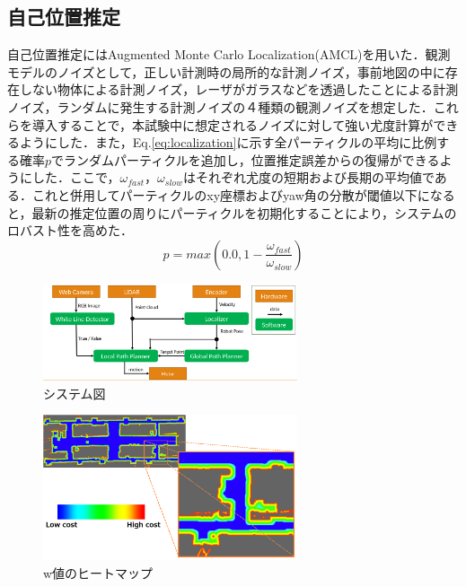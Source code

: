 \documentclass{jarticle}
\begin{document}
\subsection{自己位置推定}
自己位置推定にはAugmented Monte Carlo Localization(AMCL)\cite{localization}を用いた．観測モデルのノイズとして，正しい計測時の局所的な計測ノイズ，事前地図の中に存在しない物体による計測ノイズ，レーザがガラスなどを透過したことによる計測ノイズ，ランダムに発生する計測ノイズの４種類の観測ノイズを想定した．これらを導入することで，本試験中に想定されるノイズに対して強い尤度計算ができるようにした．また，Eq.\ref{eq:localization}に示す全パーティクルの平均に比例する確率$p$でランダムパーティクルを追加し，位置推定誤差からの復帰ができるようにした．ここで，$\omega_{fast}$，$\omega_{slow}$はそれぞれ尤度の短期および長期の平均値である．これと併用してパーティクルのxy座標およびyaw角の分散が閾値以下になると，最新の推定位置の周りにパーティクルを初期化することにより，システムのロバスト性を高めた．
\vspace{-3mm}
\begin{equation}
	p = max(0.0 , 1-\frac{\omega_{fast}}{\omega_{slow}})
\label{eq:localization}
\end{equation}
\begin{figure}
	\includegraphics[width=7.5cm]{./picture/system.png}
	\caption{システム図}
	\label{fig:system}
\end{figure}
\begin{figure}
	\includegraphics[width=7.5cm]{./picture/wallcostmap.png}
	\caption{w値のヒートマップ}
	\label{fig:wallcostmap}
\end{figure}
\vspace{-3mm}
\end{document}
